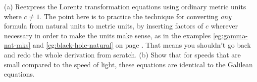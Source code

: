 (a) Reexpress the Lorentz transformation equations 
using ordinary metric units where $c\ne1$. The point here is to practice the technique
for converting \emph{any} formula from natural units to metric units, by inserting
factors of $c$ wherever necessary in order to make the units make sense, as in the
examples \ref{eg:gamma-nat-mks} and \ref{eg:black-hole-natural} on page \pageref{eg:gamma-nat-mks}. That means
you shouldn't go back and redo the whole derivation from scratch.\answercheck\hwendpart
(b) Show that for speeds that are small compared to the speed of
light, these equations are identical to the Galilean equations.
